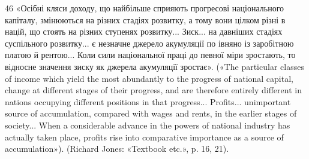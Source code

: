 46 «Осібні кляси доходу, що найбільше сприяють прогресові національного
капіталу, змінюються на різних стадіях розвитку, а тому вони
цілком різні в націй, що стоять на різних ступенях розвитку... Зиск...
на давніших стадіях суспільного розвитку... є незначне джерело акумуляції
по івняно із заробітною платою й рентою... Коли сили національної
праці до певної міри зростають, то відносне значення зиску як
джерела акумуляції зростає». («The particular classes of income which
yield the most abundantly to the progress of national capital, change at
different stages of their progress, and are therefore entirely different in
nations occupying different positions in that progress... Profits... unimportant
source of accumulation, compared with wages and rents, in the
earlier stages of society... When a considerable advance in the powers of
national industry has actually taken place, profits rise into comparative
importance as a source of accumulation»). (Richard Jones: «Textbook
etc.», p. 16, 21).
